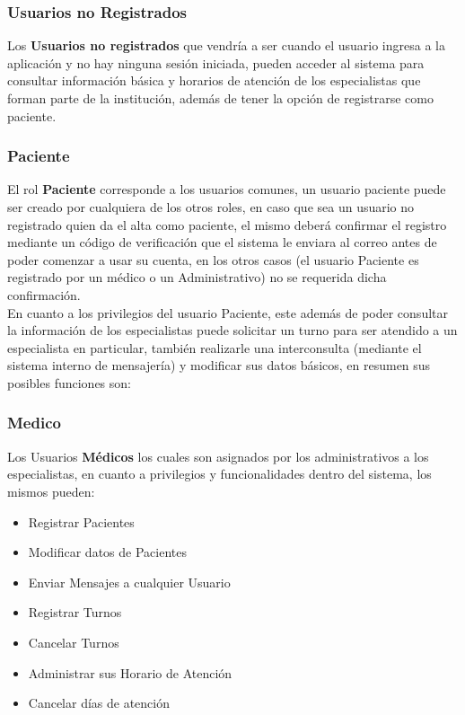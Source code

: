 \subsubsection{Usuarios no Registrados}

Los \textbf{Usuarios no registrados} que vendría a ser cuando el usuario ingresa a la aplicación y no hay ninguna sesión iniciada, pueden acceder al sistema para consultar información básica y horarios de atención de los especialistas que forman parte de la institución, además de tener la opción de registrarse como paciente.\\[0.1cm]    

\subsubsection{Paciente}

El rol \textbf{Paciente} corresponde a los usuarios comunes, un usuario paciente puede ser creado por cualquiera de los otros roles, en caso que sea un usuario no registrado quien da el alta como paciente, el mismo deberá confirmar el registro mediante un código de verificación que el sistema le enviara al correo antes de poder comenzar a usar su cuenta, en los otros casos (el usuario Paciente es registrado por un médico o un Administrativo) no se requerida dicha confirmación.\\[0.1cm]

En cuanto a los privilegios del usuario Paciente, este además de poder consultar la  información de los especialistas puede solicitar un turno para ser atendido a un especialista en particular, también realizarle una interconsulta (mediante el sistema interno de mensajería) y modificar sus datos básicos, en resumen sus posibles funciones son:


\subsubsection{Medico}

Los Usuarios \textbf{Médicos} los cuales son asignados por los administrativos a los especialistas, en cuanto a privilegios y funcionalidades dentro del sistema, los mismos pueden:

\begin{itemize}
    \item Registrar Pacientes
    \item Modificar datos de Pacientes
    \item Enviar Mensajes a cualquier Usuario
    \item Registrar Turnos 
    \item Cancelar Turnos
    \item Administrar sus Horario de Atención
    \item Cancelar días de atención
\end{itemize}

